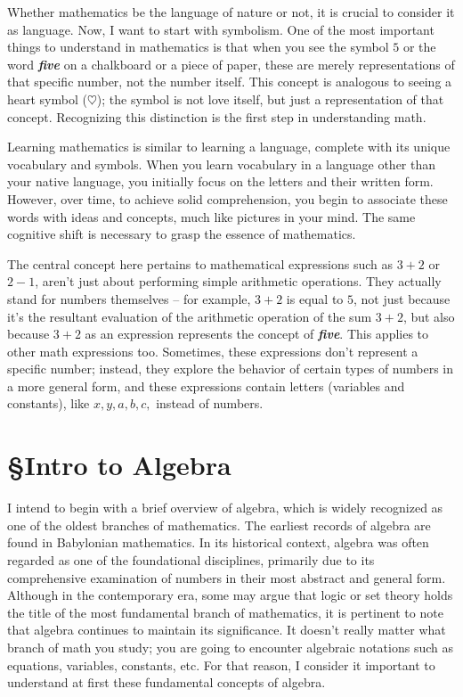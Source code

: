 Whether mathematics be the language of nature or not, it is crucial to consider it as language. Now, I want to start with symbolism. One of the most important things to understand in mathematics is that when you see the symbol $5$ or the word \textbf{\textit{five}} on a chalkboard or a piece of paper, these are merely representations of that specific number, not the number itself. This concept is analogous to seeing a heart symbol ($\heartsuit$); the symbol is not love itself, but just a representation of that concept. Recognizing this distinction is the first step in understanding math.

Learning mathematics is similar to learning a language, complete with its unique vocabulary and symbols. When you learn vocabulary in a language other than your native language, you initially focus on the letters and their written form. However, over time, to achieve solid comprehension, you begin to associate these words with ideas and concepts, much like pictures in your mind. The same cognitive shift is necessary to grasp the essence of mathematics.

The central concept here pertains to mathematical expressions such as $3 + 2$ or $2 - 1$, aren't just about performing simple arithmetic operations. They actually stand for numbers themselves – for example, $3 + 2$ is equal to $5$, not just because it's the resultant evaluation of the arithmetic operation of the sum $3 + 2$, but also because $3 + 2$ as an expression represents the concept of \textbf{\textit{five}}. This applies to other math expressions too. Sometimes, these expressions don't represent a specific number; instead, they explore the behavior of certain types of numbers in a more general form, and these expressions contain letters (variables and constants), like $x, y, a, b, c,$ instead of numbers.


\section{\S Intro to Algebra}
I intend to begin with a brief overview of algebra, which is widely recognized as one of the oldest branches of mathematics. The earliest records of algebra are found in Babylonian mathematics. In its historical context, algebra was often regarded as one of the foundational disciplines, primarily due to its comprehensive examination of numbers in their most abstract and general form. Although in the contemporary era, some may argue that logic or set theory holds the title of the most fundamental branch of mathematics, it is pertinent to note that algebra continues to maintain its significance. It doesn't really matter what branch of math you study; you are going to encounter algebraic notations such as equations, variables, constants, etc. For that reason, I consider it important to understand at first these fundamental concepts of algebra.

